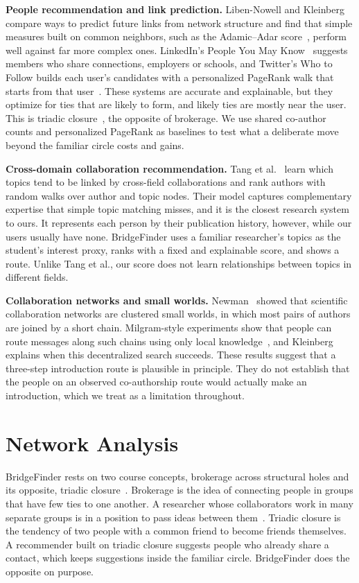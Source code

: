 \documentclass[sigconf,nonacm]{acmart}
\begin{document}
\textbf{People recommendation and link prediction.} Liben-Nowell and Kleinberg~\cite{libennowell2007} compare ways to predict future links from network structure and find that simple measures built on common neighbors, such as the Adamic--Adar score~\cite{adamic2003}, perform well against far more complex ones. LinkedIn's People You May Know~\cite{linkedin} suggests members who share connections, employers or schools, and Twitter's Who to Follow builds each user's candidates with a personalized PageRank walk that starts from that user~\cite{gupta2013}. These systems are accurate and explainable, but they optimize for ties that are likely to form, and likely ties are mostly near the user. This is triadic closure~\cite{easley2010}, the opposite of brokerage. We use shared co-author counts and personalized PageRank as baselines to test what a deliberate move beyond the familiar circle costs and gains.

\textbf{Cross-domain collaboration recommendation.} Tang et al.~\cite{tang2012} learn which topics tend to be linked by cross-field collaborations and rank authors with random walks over author and topic nodes. Their model captures complementary expertise that simple topic matching misses, and it is the closest research system to ours. It represents each person by their publication history, however, while our users usually have none. BridgeFinder uses a familiar researcher's topics as the student's interest proxy, ranks with a fixed and explainable score, and shows a route. Unlike Tang et al., our score does not learn relationships between topics in different fields.

\textbf{Collaboration networks and small worlds.} Newman~\cite{newman2001} showed that scientific collaboration networks are clustered small worlds, in which most pairs of authors are joined by a short chain. Milgram-style experiments show that people can route messages along such chains using only local knowledge~\cite{dodds2003}, and Kleinberg~\cite{kleinberg2000} explains when this decentralized search succeeds. These results suggest that a three-step introduction route is plausible in principle. They do not establish that the people on an observed co-authorship route would actually make an introduction, which we treat as a limitation throughout.

\section{Network Analysis}\label{sec:network}
BridgeFinder rests on two course concepts, brokerage across structural holes and its opposite, triadic closure~\cite{easley2010}. Brokerage is the idea of connecting people in groups that have few ties to one another. A researcher whose collaborators work in many separate groups is in a position to pass ideas between them~\cite{burt1992}. Triadic closure is the tendency of two people with a common friend to become friends themselves. A recommender built on triadic closure suggests people who already share a contact, which keeps suggestions inside the familiar circle. BridgeFinder does the opposite on purpose.
\end{document}
